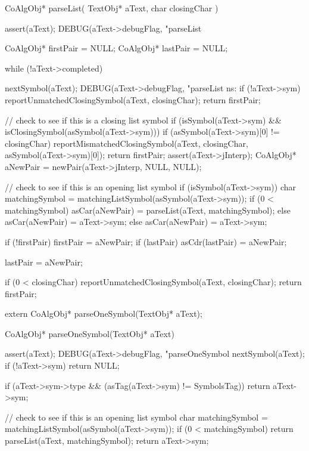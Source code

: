 \startCCode
CoAlgObj* parseList(
  TextObj* aText,
  char closingChar
) {
  assert(aText);
  DEBUG(aText->debugFlag,
    "parseList %

  CoAlgObj* firstPair = NULL;
  CoAlgObj* lastPair  = NULL;

  while (!aText->completed) {

    nextSymbol(aText);
    DEBUG(aText->debugFlag,
      "parseList ns: %
    if (!aText->sym) {
      reportUnmatchedClosingSymbol(aText, closingChar);
      return firstPair;
    }

    // check to see if this is a closing list symbol
    if (isSymbol(aText->sym) &&
        isClosingSymbol(asSymbol(aText->sym))) {
      if (asSymbol(aText->sym)[0] != closingChar) {
        reportMismatchedClosingSymbol(aText, closingChar,
                                      asSymbol(aText->sym)[0]);
      }
      return firstPair;
    }
    assert(aText->jInterp);
    CoAlgObj* aNewPair = newPair(aText->jInterp, NULL, NULL);

    // check to see if this is an opening list symbol
    if (isSymbol(aText->sym)) {
      char matchingSymbol = matchingListSymbol(asSymbol(aText->sym));
      if (0 < matchingSymbol) {
        asCar(aNewPair) = parseList(aText, matchingSymbol);
      } else asCar(aNewPair) = aText->sym;
    } else asCar(aNewPair) = aText->sym;

    if (!firstPair) firstPair       = aNewPair;
    if (lastPair)   asCdr(lastPair) = aNewPair;

    lastPair = aNewPair;
  }

  if (0 < closingChar) reportUnmatchedClosingSymbol(aText, closingChar);
  return firstPair;
}
\stopCCode


\startCHeader
extern CoAlgObj* parseOneSymbol(TextObj* aText);
\stopCHeader

\startCCode
CoAlgObj* parseOneSymbol(TextObj* aText) {
  assert(aText);
  DEBUG(aText->debugFlag, "parseOneSymbol %
  nextSymbol(aText);
  if (!aText->sym) return NULL;

  if (aText->sym->type &&
     (asTag(aText->sym) != SymbolsTag)) return aText->sym;

  // check to see if this is an opening list symbol
  char matchingSymbol = matchingListSymbol(asSymbol(aText->sym));
  if (0 < matchingSymbol) {
    return parseList(aText, matchingSymbol);
  }
  return aText->sym;
}
\stopCCode

